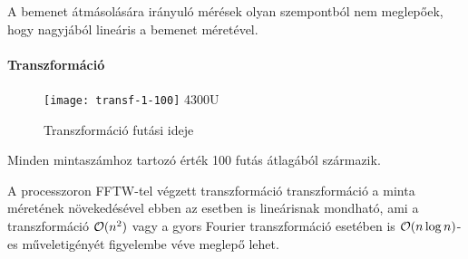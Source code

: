 A bemenet \'atm\'asol\'as\'ara ir\'anyul\'o m\'er\'esek olyan szempontb\'ol nem meglep\H oek, hogy nagyj\'ab\'ol line\'aris a bemenet m\'eret\'evel.

\paragraph{Transzform\'aci\'o}

\begin{figure}[h]
	\texttt{[image: transf-1-100]}
	{4300U}
	\centering
	\caption{Transzform\'aci\'o fut\'asi ideje}
\end{figure}

Minden mintasz\'amhoz tartoz\'o \'ert\'ek 100 fut\'as \'atlag\'ab\'ol sz\'armazik.

A processzoron FFTW-tel v\'egzett transzform\'aci\'o transzform\'aci\'o a minta m\'eret\'enek n\"oveked\'es\'evel ebben az esetben is line\'arisnak mondhat\'o, ami a transzform\'aci\'o $\mathcal{O}(n^2)$ vagy a gyors Fourier transzform\'aci\'o eset\'eben is $\mathcal{O}(n\log{n})$-es m\H uveletig\'eny\'et figyelembe v\'eve meglep\H o lehet.

